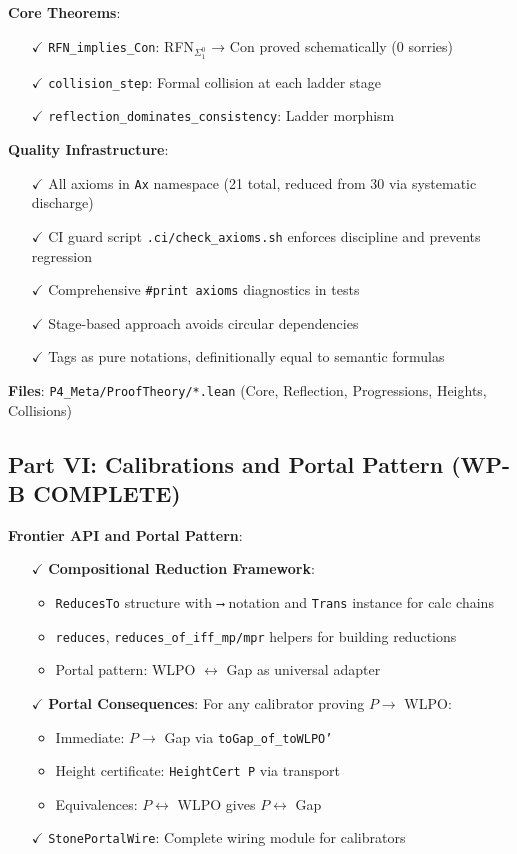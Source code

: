 \documentclass[11pt]{article}
\theoremstyle{definition}
\theoremstyle{remark}
\begin{document}
\textbf{Core Theorems}:
\begin{itemize}
\item[$\checkmark$] \texttt{RFN\_implies\_Con}: RFN$_{\Sigma^0_1}$ → Con proved schematically (0 sorries)
\item[$\checkmark$] \texttt{collision\_step}: Formal collision at each ladder stage
\item[$\checkmark$] \texttt{reflection\_dominates\_consistency}: Ladder morphism
\end{itemize}

\textbf{Quality Infrastructure}:
\begin{itemize}
\item[$\checkmark$] All axioms in \texttt{Ax} namespace (21 total, reduced from 30 via systematic discharge)
\item[$\checkmark$] CI guard script \texttt{.ci/check\_axioms.sh} enforces discipline and prevents regression
\item[$\checkmark$] Comprehensive \texttt{\#print axioms} diagnostics in tests
\item[$\checkmark$] Stage-based approach avoids circular dependencies
\item[$\checkmark$] Tags as pure notations, definitionally equal to semantic formulas
\end{itemize}

\textbf{Files}: \texttt{P4\_Meta/ProofTheory/*.lean} (Core, Reflection, Progressions, Heights, Collisions)

\subsection{Part VI: Calibrations and Portal Pattern (WP-B COMPLETE)}

\textbf{Frontier API and Portal Pattern}:
\begin{itemize}
\item[$\checkmark$] \textbf{Compositional Reduction Framework}:
  \begin{itemize}
  \item \texttt{ReducesTo} structure with \texttt{⟶} notation and \texttt{Trans} instance for calc chains
  \item \texttt{reduces}, \texttt{reduces\_of\_iff\_mp/mpr} helpers for building reductions
  \item Portal pattern: WLPO $\leftrightarrow$ Gap as universal adapter
  \end{itemize}
\item[$\checkmark$] \textbf{Portal Consequences}: For any calibrator proving $P \to$ WLPO:
  \begin{itemize}
  \item Immediate: $P \to$ Gap via \texttt{toGap\_of\_toWLPO'}
  \item Height certificate: \texttt{HeightCert P} via transport
  \item Equivalences: $P \leftrightarrow$ WLPO gives $P \leftrightarrow$ Gap
  \end{itemize}
\item[$\checkmark$] \texttt{StonePortalWire}: Complete wiring module for calibrators
\end{itemize}
\end{document}
